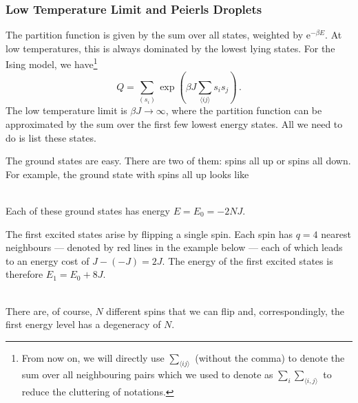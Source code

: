 \documentclass{article}
\theoremstyle{plain}\theoremheaderfont{\normalfont\bfseries}\theorembodyfont{\rmfamily}\theoremseparator{.}\newtheorem*{thm}{Theorem}\newtheorem*{law}{Law}\newtheorem*{pos}{Postulate}
\numberwithin{equation}{section}
\newcommand{\ee}{\mathrm{e}}
\begin{document}
    \subsubsection{Low Temperature Limit and Peierls Droplets}
    The partition function is given by the sum over all states, weighted by \(\ee^{-\beta E}\). At low temperatures, this is always dominated by the lowest lying states. For the Ising model, we have\footnote{From now on, we will directly use \(\sum_{\langle ij\rangle}\) (without the comma) to denote the sum over all neighbouring pairs which we used to denote as \(\sum_i\sum_{\langle i,j\rangle}\) to reduce the cluttering of notations.}
    \begin{equation}
        Q=\sum_{(s_i)}\exp\left(\beta J\sum_{\langle ij\rangle}s_i s_j\right)\,.
    \end{equation}
    The low temperature limit is \(\beta J\to\infty\), where the partition function can be approximated by the sum over the first few lowest energy states. All we need to do is list these states.

    The ground states are easy. There are two of them: spins all up or spins all down. For example, the ground state with spins all up looks like
    \begin{figure}[ht!]
        \centering
    \end{figure}
    \\Each of these ground states has energy \(E=E_0=-2NJ\).

    The first excited states arise by flipping a single spin. Each spin has \(q=4\) nearest neighbours --- denoted by red lines in the example below --- each of which leads to an energy cost of \(J-(-J)=2J\). The energy of the first excited states is therefore \(E_1=E_0+8J\).
    \begin{figure}[ht!]
        \centering
    \end{figure}
    \\There are, of course, \(N\) different spins that we can flip and, correspondingly, the first energy level has a degeneracy of \(N\).
\end{document}
